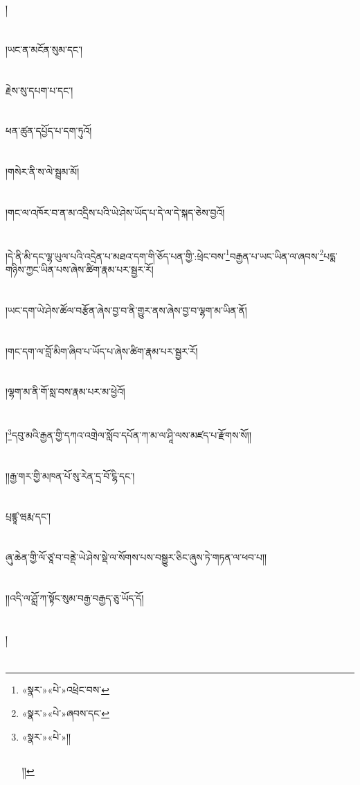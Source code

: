 །\chapter{ }།ཡང་ན་མངོན་སུམ་དང་།\chapter{ }རྗེས་སུ་དཔག་པ་དང་།\chapter{ }ཕན་ཚུན་དཔྱོད་པ་དག་ཏུའོ།\chapter{ }།གསེར་ནི་ས་ལེ་སྦྲམ་མོ།\chapter{ }།གང་ལ་འཁོར་བ་ན་མ་འདྲིས་པའི་ཡེ་ཤེས་ཡོད་པ་དེ་ལ་དེ་སྐད་ཅེས་བྱའོ།\chapter{ }།དེ་ནི་མི་དང་ལྷ་ཡུལ་པའི་འདྲེན་པ་མཐའ་དག་གི་ཅོད་པན་གྱི་:ཕྲེང་བས་\footnote{«སྣར་»«པེ་»འཕྲེང་བས་}བརྒྱན་པ་ཡང་ཡིན་ལ་ཞབས་\footnote{«སྣར་»«པེ་»ཞབས་དང་}པདྨ་གཉིས་ཀྱང་ཡིན་པས་ཞེས་ཚིག་རྣམ་པར་སྦྱར་རོ།\chapter{ }།ཡང་དག་ཡེ་ཤེས་ཚོལ་བརྩོན་ཞེས་བྱ་བ་ནི་གྱུར་ནས་ཞེས་བྱ་བ་ལྷག་མ་ཡིན་ནོ།\chapter{ }།གང་དག་ལ་བློ་མིག་ཞིབ་པ་ཡོད་པ་ཞེས་ཚིག་རྣམ་པར་སྦྱར་རོ།\chapter{ }།ལྷག་མ་ནི་གོ་སླ་བས་རྣམ་པར་མ་ཕྱེའོ།\chapter{ }།\footnote{«སྣར་»«པེ་»།།\chapter{ }།།}དབུ་མའི་རྒྱན་གྱི་དཀའ་འགྲེལ་སློབ་དཔོན་ཀ་མ་ལ་ཤཱི་ལས་མཛད་པ་རྫོགས་སོ།།\chapter{ }།།རྒྱ་གར་གྱི་མཁན་པོ་སུ་རེན་དྲ་བོ་ངྷི་དང་།\chapter{ }པྲཛྙཱ་ཝརྨ་དང་།\chapter{ }ཞུ་ཆེན་གྱི་ལོ་ཙཱ་བ་བནྡེ་ཡེ་ཤེས་སྡེ་ལ་སོགས་པས་བསྒྱུར་ཅིང་ཞུས་ཏེ་གཏན་ལ་ཕབ་པ།།\chapter{ }།།འདི་ལ་ཤློ་ཀ་སྟོང་སུམ་བརྒྱ་བརྒྱད་ཅུ་ཡོད་དོ།\chapter{ }།\chapter{ }